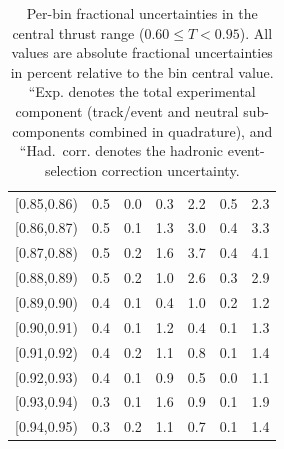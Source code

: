 \begin{table}[t!]
\begin{tabular}{c c c c c c c}
[0.85,0.86) & 0.5 & 0.0 & 0.3 & 2.2 & 0.5 & 2.3 \\
[0.86,0.87) & 0.5 & 0.1 & 1.3 & 3.0 & 0.4 & 3.3 \\
[0.87,0.88) & 0.5 & 0.2 & 1.6 & 3.7 & 0.4 & 4.1 \\
[0.88,0.89) & 0.5 & 0.2 & 1.0 & 2.6 & 0.3 & 2.9 \\
[0.89,0.90) & 0.4 & 0.1 & 0.4 & 1.0 & 0.2 & 1.2 \\
[0.90,0.91) & 0.4 & 0.1 & 1.2 & 0.4 & 0.1 & 1.3 \\
[0.91,0.92) & 0.4 & 0.2 & 1.1 & 0.8 & 0.1 & 1.4 \\
[0.92,0.93) & 0.4 & 0.1 & 0.9 & 0.5 & 0.0 & 1.1 \\
[0.93,0.94) & 0.3 & 0.1 & 1.6 & 0.9 & 0.1 & 1.9 \\
[0.94,0.95) & 0.3 & 0.2 & 1.1 & 0.7 & 0.1 & 1.4 \\
\hline
\end{tabular}
\normalsize
\caption{Per-bin fractional uncertainties in the central thrust range ($0.60 \leq T < 0.95$). All values are absolute fractional uncertainties in percent relative to the bin central value. ``Exp. denotes the total experimental component (track/event and neutral sub-components combined in quadrature), and ``Had.\ corr. denotes the hadronic event-selection correction uncertainty.}
\label{tab:per_bin_uncertainty}
\end{table}
